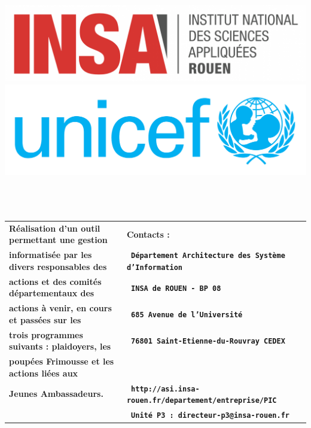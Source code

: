 \documentclass[dvipsnames,a2paper]{paper}
\begin{document}
\includegraphics[scale=0.28]{images/affiche/logo-insa.png} 
\hspace{3cm}
\includegraphics[scale=0.28]{images/affiche/logo-unicef.jpg} \\~\\~\\~\\
\centering
	\begin{longtable}{p{19.7cm}|p{19.7cm}}
	{\textbf{\Huge \textsf{R\'ealisation d'un outil permettant une gestion }}} & 
	{\textbf{\Huge \textsf{ Contacts : }}}\\
	{\textbf{\Huge \textsf{informatis\'ee par les divers responsables des }}} & 
	{\textbf{\huge \texttt{ D\'epartement Architecture des Syst\`eme d'Information }}}\\
	{\textbf{\Huge \textsf{actions et des comit\'es d\'epartementaux des }}} & 
	{\textbf{\huge \texttt{ INSA de ROUEN - BP 08 }}}\\
	{\textbf{\Huge \textsf{actions \`a venir, en cours et passées sur les }}} & 
	{\textbf{\huge \texttt{ 685 Avenue de l'Universit\'e }}}\\
	{\textbf{\Huge \textsf{trois programmes suivants : plaidoyers, les }}} & 
	{\textbf{\huge \texttt{ 76801 Saint-Etienne-du-Rouvray CEDEX }}}\\
	{\textbf{\Huge \textsf{poup\'ees Frimousse et les actions li\'ees aux }}} & 
	{\textbf{\huge \texttt{  }}}\\
	{\textbf{\Huge \textsf{Jeunes Ambassadeurs.}}} & 
	{\textbf{\huge \texttt{ http://asi.insa-rouen.fr/departement/entreprise/PIC }}}\\
	{\textbf{\Huge \textsf{}}} & 
	{\textbf{\huge \texttt{ Unit\'e P3 : directeur-p3@insa-rouen.fr }}}
\end{longtable}
~\\~\\~\\~\\~\\
\end{document}

